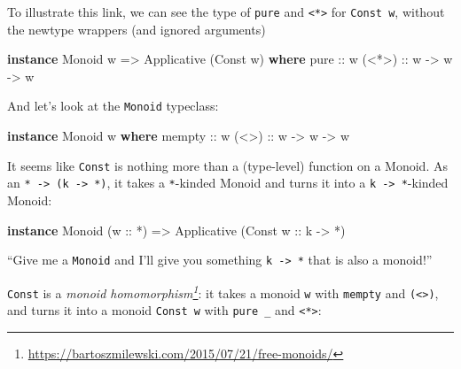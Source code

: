 \documentclass[]{article}
\newenvironment{Shaded}{}{}
\newcommand{\DataTypeTok}[1]{\textcolor[rgb]{0.56,0.13,0.00}{#1}}
\newcommand{\KeywordTok}[1]{\textcolor[rgb]{0.00,0.44,0.13}{\textbf{#1}}}
\newcommand{\NormalTok}[1]{#1}
\newcommand{\OperatorTok}[1]{\textcolor[rgb]{0.40,0.40,0.40}{#1}}
\newcommand{\OtherTok}[1]{\textcolor[rgb]{0.00,0.44,0.13}{#1}}
\renewcommand{\href}[2]{#2\footnote{\url{#1}}}
\begin{document}
To illustrate this link, we can see the type of \texttt{pure} and
\texttt{\textless{}*\textgreater{}} for \texttt{Const\ w}, without the newtype
wrappers (and ignored arguments)

\begin{Shaded}
\begin{Highlighting}[]
\KeywordTok{instance} \DataTypeTok{Monoid}\NormalTok{ w }\OtherTok{=>} \DataTypeTok{Applicative}\NormalTok{ (}\DataTypeTok{Const}\NormalTok{ w) }\KeywordTok{where}
\OtherTok{    pure  ::}\NormalTok{ w}
\OtherTok{    (<*>) ::}\NormalTok{ w }\OtherTok{{-}>}\NormalTok{ w }\OtherTok{{-}>}\NormalTok{ w}
\end{Highlighting}
\end{Shaded}

And let's look at the \texttt{Monoid} typeclass:

\begin{Shaded}
\begin{Highlighting}[]
\KeywordTok{instance} \DataTypeTok{Monoid}\NormalTok{ w }\KeywordTok{where}
\OtherTok{    mempty ::}\NormalTok{ w}
\OtherTok{    (<>)   ::}\NormalTok{ w }\OtherTok{{-}>}\NormalTok{ w }\OtherTok{{-}>}\NormalTok{ w}
\end{Highlighting}
\end{Shaded}

It seems like \texttt{Const} is nothing more than a (type-level) function on a
Monoid. As an \texttt{*\ -\textgreater{}\ (k\ -\textgreater{}\ *)}, it takes a
\texttt{*}-kinded Monoid and turns it into a
\texttt{k\ -\textgreater{}\ *}-kinded Monoid:

\begin{Shaded}
\begin{Highlighting}[]
\KeywordTok{instance} \DataTypeTok{Monoid}\NormalTok{ (}\OtherTok{w ::} \OperatorTok{*}\NormalTok{) }\OtherTok{=>} \DataTypeTok{Applicative}\NormalTok{ (}\DataTypeTok{Const}\OtherTok{ w ::}\NormalTok{ k }\OtherTok{{-}>} \OperatorTok{*}\NormalTok{)}
\end{Highlighting}
\end{Shaded}

``Give me a \texttt{Monoid} and I'll give you something
\texttt{k\ -\textgreater{}\ *} that is also a monoid!''

\texttt{Const} is a
\emph{\href{https://bartoszmilewski.com/2015/07/21/free-monoids/}{monoid
homomorphism}}: it takes a monoid \texttt{w} with \texttt{mempty} and
\texttt{(\textless{}\textgreater{})}, and turns it into a monoid
\texttt{Const\ w} with \texttt{pure\ \_} and
\texttt{\textless{}*\textgreater{}}:
\end{document}
